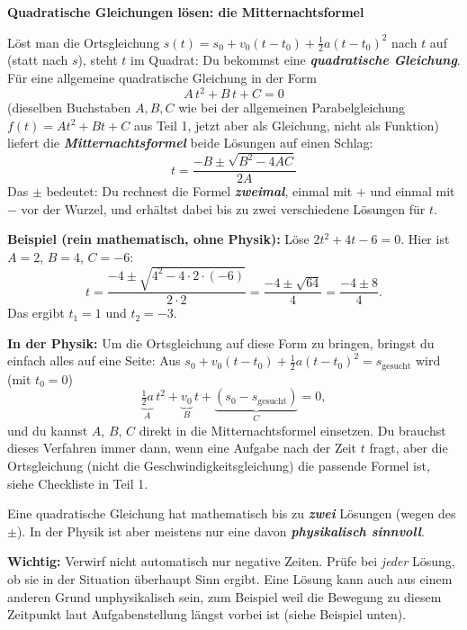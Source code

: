 \documentclass[addpoints,11pt,a4paper]{exam}
\newenvironment{theoriebox}[1][Theorie]{%
  \par\addvspace{10pt}\noindent\textbf{#1}\par\smallskip\noindent
}{%
  \par\addvspace{10pt}
}
\begin{document}
\begin{theoriebox}[Quadratische Gleichungen lösen: die Mitternachtsformel]
Löst man die Ortsgleichung $s(t)=s_0+v_0(t-t_0)+\frac{1}{2}a(t-t_0)^2$
nach $t$ auf (statt nach $s$), steht $t$ im Quadrat: Du bekommst eine
\textbf{\emph{quadratische Gleichung}}. Für eine allgemeine quadratische
Gleichung in der Form
\[
  A\,t^2 + B\,t + C = 0
\]
(dieselben Buchstaben $A,B,C$ wie bei der allgemeinen Parabelgleichung
$f(t)=At^2+Bt+C$ aus Teil 1, jetzt aber als Gleichung, nicht als
Funktion) liefert die
\textbf{\emph{Mitternachtsformel}} beide Lösungen auf einen Schlag:
\[
  \boxed{t = \frac{-B \pm \sqrt{B^2-4AC}}{2A}}
\]
Das $\pm$ bedeutet: Du rechnest die Formel \textbf{\emph{zweimal}}, einmal
mit $+$ und einmal mit $-$ vor der Wurzel, und erhältst dabei bis zu zwei
verschiedene Lösungen für $t$.

\textbf{Beispiel (rein mathematisch, ohne Physik):} Löse
$2t^2+4t-6=0$. Hier ist $A=2$, $B=4$, $C=-6$:
\[
  t = \frac{-4\pm\sqrt{4^2-4\cdot2\cdot(-6)}}{2\cdot2}
  = \frac{-4\pm\sqrt{64}}{4} = \frac{-4\pm8}{4}.
\]
Das ergibt $t_1=1$ und $t_2=-3$.

\textbf{In der Physik:} Um die Ortsgleichung auf diese Form zu bringen,
bringst du einfach alles auf eine Seite: Aus
$s_0+v_0(t-t_0)+\frac{1}{2}a(t-t_0)^2 = s_{\text{gesucht}}$ wird (mit
$t_0=0$)
\[
  \underbrace{\tfrac{1}{2}a}_{A}\,t^2 + \underbrace{v_0}_{B}\,t + \underbrace{(s_0-s_{\text{gesucht}})}_{C} = 0,
\]
und du kannst $A$, $B$, $C$ direkt in die Mitternachtsformel einsetzen.
Du brauchst dieses Verfahren immer dann, wenn eine Aufgabe nach der Zeit
$t$ fragt, aber die Ortsgleichung (nicht die Geschwindigkeitsgleichung)
die passende Formel ist, siehe Checkliste in Teil 1.

Eine quadratische Gleichung hat mathematisch bis zu \textbf{\emph{zwei}}
Lösungen (wegen des $\pm$). In der Physik ist aber meistens nur eine
davon \textbf{\emph{physikalisch sinnvoll}}.

\textbf{Wichtig:} Verwirf nicht automatisch nur negative Zeiten. Prüfe
bei \emph{jeder} Lösung, ob sie in der Situation überhaupt Sinn ergibt.
Eine Lösung kann auch aus einem anderen Grund unphysikalisch sein, zum
Beispiel weil die Bewegung zu diesem Zeitpunkt laut Aufgabenstellung
längst vorbei ist (siehe Beispiel unten).
\end{theoriebox}
\end{document}
